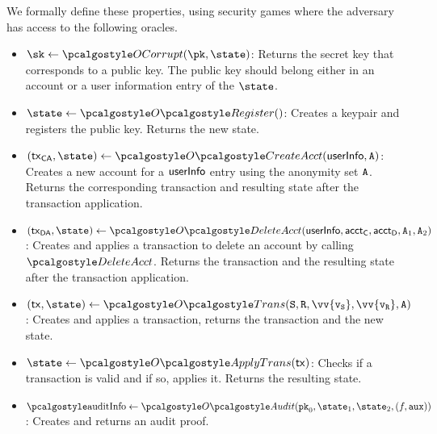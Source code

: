 We formally define these properties, using security games where the adversary has access to the following oracles.
\begin{itemize}
    \item $\sk \gets \corruptOracle(\pk, \state)$: Returns the secret key that corresponds to a public key. The public key should belong either in an account or a user information entry of the $\state$.
    \item $\state \gets \regOracle()$: Creates a keypair and registers the public key. Returns the new state.
    \item $(\txnca, \state) \gets \createAcctOracle(\userinfo, \anset)$: Creates a new account for a $\textup{\textsf{userInfo}}$ entry using the anonymity set ${\mathtt{A}}$. Returns the corresponding transaction and resulting state after the transaction application.
    \item $(\txnda, \state) \gets \deleteAcctOracle(\userinfo, \accttotransfer, \accttodelete, \anset_1, \anset_2)$: Creates and applies a transaction to delete an account by calling $\deleteAcct$. Returns the transaction and the resulting state after the transaction application.
    \item $(\txn, \state) \gets \transOracle(\sset, \rset, \vv{\v_\sset}, \vv{\v_\rset}, \anset)$: Creates and applies a transaction, returns the transaction and the new state.
    \item $\state \gets \applytxnOracle(\txn)$: Checks if a transaction is valid and if so, applies it. Returns the resulting state.
    \item $\auditinfo \gets \auditOracle(\inpk, \state_1,\state_2, (f, \aux))$: Creates and returns an audit proof.
\end{itemize}


